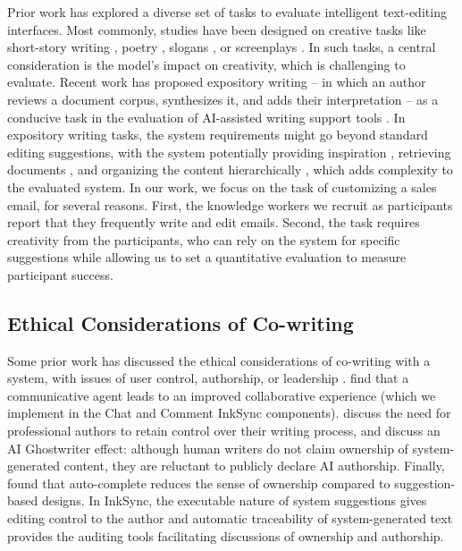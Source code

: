 \documentclass[manuscript]{acmart}
\begin{document}
Prior work has explored a diverse set of tasks to evaluate intelligent text-editing interfaces. Most commonly, studies have been designed on creative tasks like short-story writing \cite{calderwood2020novelists,coenen2021wordcraft,lee2022coauthor,chung2022talebrush,singh2022hide,clark2018creative}, poetry \cite{chakrabarty2022help}, slogans \cite{clark2018creative}, or screenplays \cite{mirowski2023co}. In such tasks, a central consideration is the model's impact on creativity, which is challenging to evaluate. Recent work has proposed expository writing -- in which an author reviews a document corpus, synthesizes it, and adds their interpretation -- as a conducive task in the evaluation of AI-assisted writing support tools \cite{shen2023beyond}. In expository writing tasks, the system requirements might go beyond standard editing suggestions, with the system potentially providing inspiration \cite{gero2022sparks}, retrieving documents \cite{han2022passages}, and organizing the content hierarchically \cite{kang2022threddy}, which adds complexity to the evaluated system. In our work, we focus on the task of customizing a sales email, for several reasons. First, the knowledge workers we recruit as participants report that they frequently write and edit emails. Second, the task requires creativity from the participants, who can rely on the system for specific suggestions while allowing us to set a quantitative evaluation to measure participant success.

\subsection{Ethical Considerations of Co-writing} \label{sec:rel_work_ethics}

Some prior work has discussed the ethical considerations of co-writing with a system, with issues of user control, authorship, or leadership \cite{chen2023next}. \citet{rezwana2022identifying} find that a communicative agent leads to an improved collaborative experience (which we implement in the Chat and Comment InkSync components). \citet{biermann2022tool} discuss the need for professional authors to retain control over their writing process, and \citet{draxler2023ai} discuss an AI Ghostwriter effect: although human writers do not claim ownership of system-generated content, they are reluctant to publicly declare AI authorship. Finally, \citet{lehmann2022suggestion} found that auto-complete reduces the sense of ownership compared to suggestion-based designs. In InkSync, the executable nature of system suggestions gives editing control to the author and automatic traceability of system-generated text provides the auditing tools facilitating discussions of ownership and authorship.
\end{document}
